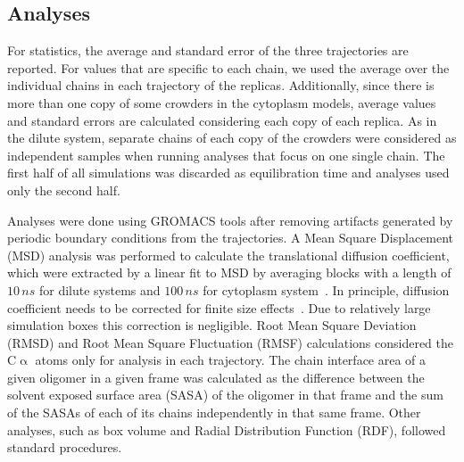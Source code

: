 \documentclass[journal=jcisd8,manuscript=article]{achemso}
\begin{document}
\subsection{Analyses}
For statistics, the average and standard error of the three trajectories are reported. For values that
are specific to each chain, we used the average over the individual
chains in each trajectory of the replicas. Additionally, since there
is more than one copy of some crowders in the cytoplasm models,
average values and standard errors are calculated considering each copy of each replica. As in the dilute system, separate chains of each copy
of the crowders were considered as independent samples when running
analyses that focus on one single chain. The first half of all
simulations was discarded as equilibration time and analyses used only
the second half.

Analyses were done using GROMACS tools after removing artifacts
generated by periodic boundary conditions from the trajectories. A
Mean Square Displacement (MSD) analysis was performed to calculate the
translational diffusion coefficient, which were extracted by a linear
fit to MSD by averaging blocks with a length of $10\, ns$ for dilute systems and $100\, ns$ 
for cytoplasm system~\cite{Allen1987a}. In principle, diffusion
coefficient needs to be corrected for finite size
effects~\cite{Yeh2004,Abraham2018}. Due to relatively large simulation boxes
this correction is negligible. 
Root Mean Square Deviation (RMSD) and Root Mean Square
Fluctuation (RMSF) calculations considered the C$\upalpha$ atoms only for analysis in each trajectory.
The chain interface area of a given oligomer in a given
frame was calculated as the difference between the solvent exposed
surface area (SASA) of the oligomer in that frame and the sum of the
SASAs of each of its chains independently in that same frame. Other
analyses, such as box volume and Radial Distribution Function (RDF),
followed standard procedures.
\end{document}
